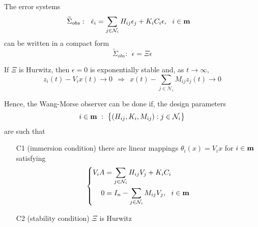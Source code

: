 \documentclass{beamer}
\begin{document}
\begin{frame}{\color{blue} }

The error systems
\begin{align*}
\widetilde{\Sigma}_{obs}:~~ \dot{\epsilon}_{i}&=\sum_{j\in\mathcal{N}_{i}} H_{ij}\epsilon_{j} + K_{i}C_{i}\epsilon,~~ i\in{\bf m}
\end{align*}
can be written in a compact form
\begin{equation*}
\widetilde{\Sigma}_{obs}:~~ \dot{\epsilon}=\Xi \epsilon
\end{equation*}

If $\Xi$ is Hurwitz, then $\epsilon=0$ is exponentially stable and, as $t\rightarrow\infty$,
\begin{equation*}
z_{i}(t)-V_{i}x(t)\rightarrow0 ~~\Rightarrow~~ x(t)-\sum_{j\in\mathcal{N}_{i}} M_{ij}z_{j}(t)\rightarrow0
\end{equation*}

\end{frame}



\begin{frame}{\color{blue} }

Hence, the Wang-Morse observer can be done if, the design parameters
\begin{equation*}
i\in{\bf m} ~:~ \big\{(H_{ij}, K_{i}, M_{ij}) : j\in\mathcal{N}_{i}\big\}
\end{equation*}
are such that
\begin{itemize}
  \item [C1] (immersion condition) there are {\color{red} linear mappings $\theta_{i}(x)=V_{i}x$} for $i\in{\bf m}$ satisfying
\begin{equation*}
\left\{\begin{split}
V_{i}A&=\sum_{j\in\mathcal{N}_{i}} H_{ij}V_{j} + K_{i}C_{i} \\
0&=I_{n}-\sum_{j\in\mathcal{N}_{i}} M_{ij}V_{j},~~ i\in{\bf m}
\end{split}\right.
\end{equation*}


  \item [C2] (stability condition) $\Xi$ is Hurwitz
\end{itemize}
\end{frame}
\end{document}
